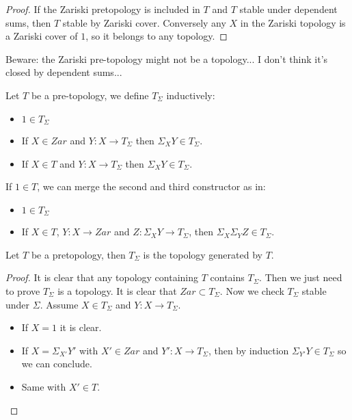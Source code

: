 \begin{proof}
If the Zariski pretopology is included in $T$ and $T$ stable under dependent sums, then $T$ stable by Zariski cover. Conversely any $X$ in the Zariski topology is a Zariski cover of $1$, so it belongs to any topology.
\end{proof}

Beware: the Zariski pre-topology might not be a topology... I don't think it's closed by dependent sums...

\begin{definition}
Let $T$ be a pre-topology, we define $T_\Sigma$ inductively:
\begin{itemize}
\item $1\in T_\Sigma$
\item If $X\in Zar$ and $Y:X\to T_\Sigma$ then $\Sigma_XY\in T_\Sigma$.
\item If $X\in T$ and $Y:X\to T_\Sigma$ then $\Sigma_XY\in T_\Sigma$.
\end{itemize}
\end{definition}

\begin{remark}
If $1\in T$, we can merge the second and third constructor as in:
\begin{itemize}
\item $1\in T_\Sigma$
 \item If $X\in T$, $Y:X\to Zar$ and $Z:\Sigma_XY\to T_\Sigma$, then $\Sigma_X\Sigma_YZ\in T_\Sigma$.
\end{itemize}
\end{remark}

\begin{lemma}\label{description-topology}
Let $T$ be a pretopology, then $T_\Sigma$ is the topology generated by $T$.
\end{lemma}

\begin{proof}
It is clear that any topology containing $T$ contains $T_\Sigma$. Then we just need to prove $T_\Sigma$ is a topology. It is clear that $Zar\subset T_\Sigma$. Now we check $T_\Sigma$ stable under $\Sigma$. Assume $X\in T_\Sigma$ and $Y:X\to T_\Sigma$.
\begin{itemize}
\item If $X=1$ it is clear.
\item If $X=\Sigma_{X'}Y'$ with $X'\in Zar$ and $Y':X\to T_\Sigma$, then by induction $\Sigma_{Y'}Y\in T_\Sigma$ so we can conclude.
\item Same with $X'\in T$.
\end{itemize}
\end{proof}

